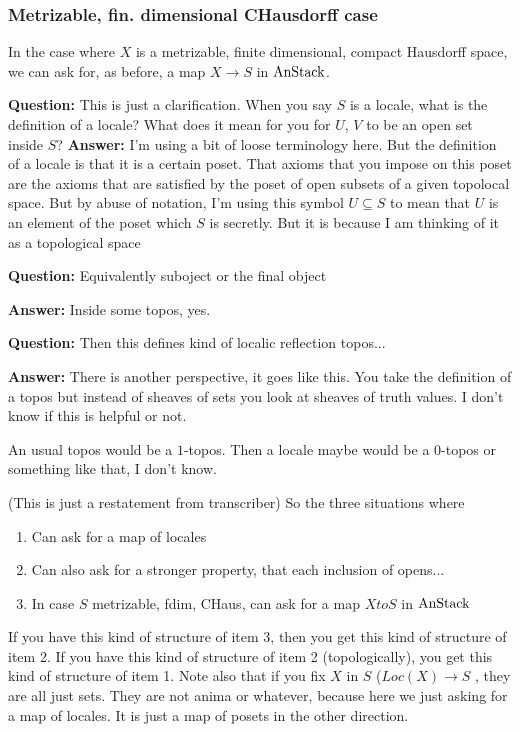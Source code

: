 \subsubsection{Metrizable, fin. dimensional CHausdorff case} \label{subsubsec:metrizable_etc_case}
In the case where $X$ is a metrizable, finite dimensional, compact Hausdorff space, we can ask for, as before, a map $X \to S$ in $\text{AnStack}$.

\textbf{Question:} This is just a clarification. When you say $S$ is a locale, what is the definition of a locale? What does it mean for you for $U$, $V$ to be an open set inside $S$?
\textbf{Answer:} I'm using a bit of loose terminology here. But the definition of a locale is that it is a certain poset. That axioms that you impose on this poset are the axioms that are satisfied by the poset of open subsets of a given topolocal space.
But by abuse of notation, I'm using this symbol $U \subseteq S$ to mean that $U$ is an element of the poset which $S$ is secretly. But it is because I am thinking of it as a topological space 


\textbf{Question:} Equivalently suboject or the final object  

\textbf{Answer:} Inside some topos, yes. 

\textbf{Question:} Then this defines kind of localic reflection topos...


\textbf{Answer:} There is another perspective, it goes like this. You take the definition of a topos but instead of sheaves of sets you look at sheaves of truth values. I don't know if this is helpful or not.

An usual topos would be a $1$-topos. Then a locale maybe would be a $0$-topos or something like that, I don't know.

(This is just a restatement from transcriber)
So the three situations where
\begin{enumerate}
\item Can ask for a map of locales
\item Can also ask for a stronger property, that each inclusion of opens...
\item In case $S$ metrizable, fdim, CHaus, can ask for a map $X to S$ in $\text{AnStack}$
\end{enumerate}


If you have this kind of structure of item 3, then you get this kind of structure of item 2. If you have this kind of structure of item 2 (topologically), you get this kind of structure  of item 1.
Note also that if you fix $X$ in $S$ ($Loc(X) \to S$ ,  they are all just sets. They are not anima or whatever, because here we just asking for a map of locales. It is just a map of posets in the other direction. 

